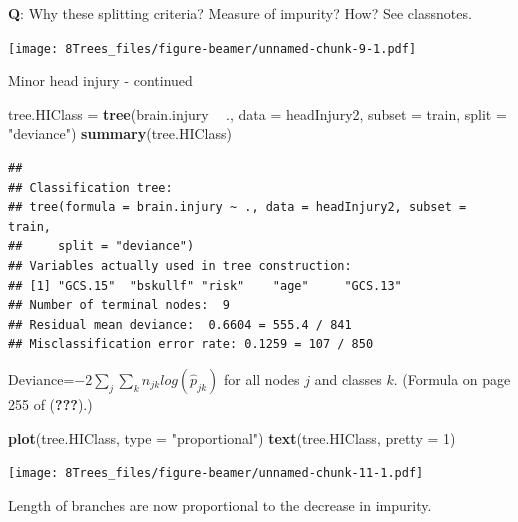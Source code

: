 \documentclass[10pt,ignorenonframetext,]{beamer}
\newenvironment{Shaded}{\begin{snugshade}}{\end{snugshade}}
\newcommand{\KeywordTok}[1]{\textcolor[rgb]{0.13,0.29,0.53}{\textbf{#1}}}
\newcommand{\DataTypeTok}[1]{\textcolor[rgb]{0.13,0.29,0.53}{#1}}
\newcommand{\DecValTok}[1]{\textcolor[rgb]{0.00,0.00,0.81}{#1}}
\newcommand{\StringTok}[1]{\textcolor[rgb]{0.31,0.60,0.02}{#1}}
\newcommand{\OperatorTok}[1]{\textcolor[rgb]{0.81,0.36,0.00}{\textbf{#1}}}
\newcommand{\NormalTok}[1]{#1}
\begin{document}
\begin{frame}

\textbf{Q}: Why these splitting criteria? Measure of impurity? How? See
classnotes.

\texttt{[image: 8Trees\_files/figure-beamer/unnamed-chunk-9-1.pdf]}

\end{frame}

\begin{frame}[fragile]

\begin{block}{Minor head injury - continued}

\footnotesize

\begin{Shaded}
\begin{Highlighting}[]
\NormalTok{tree.HIClass =}\StringTok{ }\KeywordTok{tree}\NormalTok{(brain.injury }\OperatorTok{~}\StringTok{ }\NormalTok{., }\DataTypeTok{data =}\NormalTok{ headInjury2, }\DataTypeTok{subset =}\NormalTok{ train, }
    \DataTypeTok{split =} \StringTok{"deviance"}\NormalTok{)}
\KeywordTok{summary}\NormalTok{(tree.HIClass)}
\end{Highlighting}
\end{Shaded}

\begin{verbatim}
## 
## Classification tree:
## tree(formula = brain.injury ~ ., data = headInjury2, subset = train, 
##     split = "deviance")
## Variables actually used in tree construction:
## [1] "GCS.15"  "bskullf" "risk"    "age"     "GCS.13" 
## Number of terminal nodes:  9 
## Residual mean deviance:  0.6604 = 555.4 / 841 
## Misclassification error rate: 0.1259 = 107 / 850
\end{verbatim}

\normalsize

Deviance=\(-2 \sum_{j}\sum_{k}n_{jk}log(\hat{p}_{jk})\) for all nodes
\(j\) and classes \(k\). (Formula on page 255 of ({\textbf{???}}).)

\end{block}

\end{frame}

\begin{frame}[fragile]

\begin{Shaded}
\begin{Highlighting}[]
\KeywordTok{plot}\NormalTok{(tree.HIClass, }\DataTypeTok{type =} \StringTok{"proportional"}\NormalTok{)}
\KeywordTok{text}\NormalTok{(tree.HIClass, }\DataTypeTok{pretty =} \DecValTok{1}\NormalTok{)}
\end{Highlighting}
\end{Shaded}

\texttt{[image: 8Trees\_files/figure-beamer/unnamed-chunk-11-1.pdf]}

Length of branches are now proportional to the decrease in impurity.

\end{frame}
\end{document}
